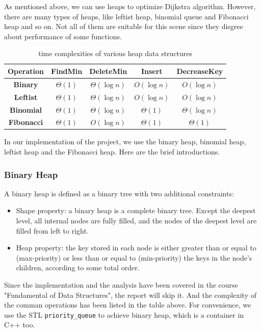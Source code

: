 \documentclass[twoside]{article}
\begin{document}
\begin{CJK*}{UTF8}{gbsn}
As mentioned above, we can use heaps to optimize Dijkstra algorithm. However, there are many types of heaps, like leftist heap, binomial queue and Fibonacci heap and so on. Not all of them are suitable for this scene since they disgree about performance of some functions.
    \begin{table}[H]
        \centering
    \begin{tabular}{|c|c|c|c|c|}
        \hline
        \textbf{Operation} & \textbf{FindMin} & \textbf{DeleteMin} & \textbf{Insert} & \textbf{DecreaseKey} \\
        \hline
        \textbf{Binary} & $\Theta(1)$ & $\Theta(\log n)$ & $O(\log n)$ & $O(\log n)$ \\
        \hline
        \textbf{Leftist} & $\Theta(1)$ & $\Theta(\log n)$ & $O(\log n)$ & $O(\log n)$ \\
        \hline
        \textbf{Binomial} & $\Theta(1)$ & $\Theta(\log n)$ & $\Theta(1)$ & $\Theta(\log n)$ \\
        \hline
        \textbf{Fibonacci} & $\Theta(1)$ & $O(\log n)$ & $\Theta(1)$ & $\Theta(1)$ \\
        \hline
    \end{tabular}
    \caption{time complexities of various heap data structures} 
\end{table}

In our implementation of the project, we use the binary heap, binomial heap, leftist heap and the Fibonacci heap. Here are the brief introductions. 

\subsubsection{Binary Heap}
A binary heap\cite{003} is defined as a binary tree with two additional constraints:
\begin{itemize}
    \item Shape property: a binary heap is a complete binary tree. Except the deepest level, all internal nodes are fully filled, and the nodes of the deepest level are filled from left to right.   
    \item Heap property: the key stored in each node is either greater than or equal to (max-priority) or less than or equal to (min-priority) the keys in the node's children, according to some total order.
\end{itemize}

Since the implementation and the analysis have been covered in the course "Fundamental of Data Structures", the report will skip it. And the complexity of the comman operations has been listed in the table above. For convenience, we use the STL \verb|priority_queue| to achieve binary heap, which is a container in C++ too.

\end{CJK*}
\end{document}
